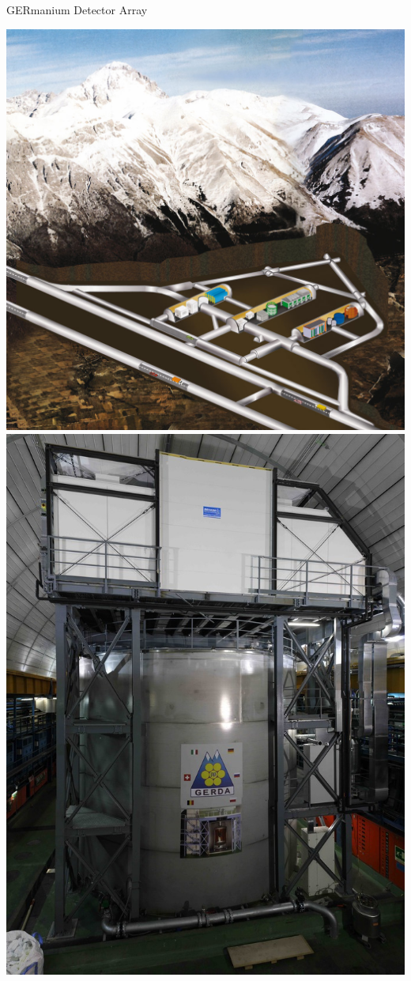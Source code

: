 \documentclass[10pt,aspectratio=169]{beamer}
\begin{document}
\begin{frame}[plain]{\alert{GER}manium \alert{D}etector \alert{A}rray}
  \begin{center}
    \includegraphics[height=0.95\textheight]{setup/lngs-map.jpg}
    \hspace{0.2cm}
    \includegraphics[height=0.95\textheight]{setup/gerda-lngs.jpg}
  \end{center}
\end{frame}
\end{document}
